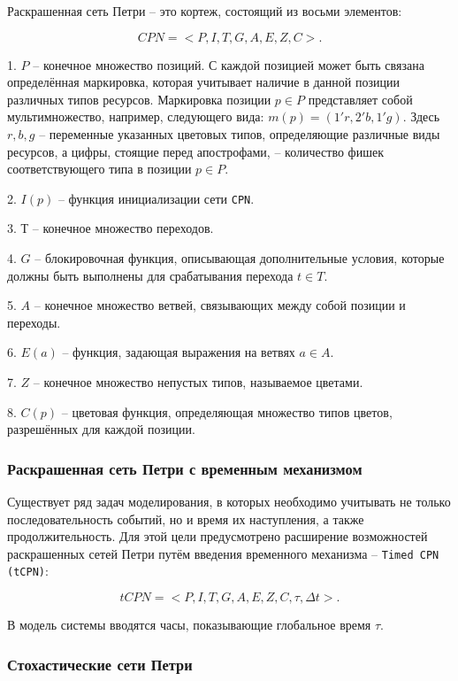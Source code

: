 Раскрашенная сеть Петри -- это кортеж, состоящий из восьми элементов:

\begin{equation}
	CPN = <P, I, T, G, A, E, Z, C>.
\end{equation}

1. $P$ -- конечное множество позиций. С каждой позицией может
быть связана определённая маркировка, которая учитывает наличие
в данной позиции различных типов ресурсов. Маркировка позиции
$p \in P$ представляет собой мультимножество, например, следующего
вида: $m(p) = (1'r,2'b,1'g)$. Здесь $r, b, g$ -- переменные указанных цветовых типов, определяющие различные виды ресурсов, а цифры, стоящие перед апострофами, -- количество фишек соответствующего типа
в позиции $p \in P$.

2. $I(p)$ -- функция инициализации сети \texttt{CPN}.

3. $Т$ -- конечное множество переходов.

4. $G$ -- блокировочная функция, описывающая дополнительные условия, которые должны быть выполнены для срабатывания перехода $t \in T$.

5. $A$ -- конечное множество ветвей, связывающих между собой позиции и переходы.

6. $E(a)$ -- функция, задающая выражения на ветвях $a \in A$.

7. $Z$ -- конечное множество непустых типов, называемое цветами.

8. $C(p)$ -- цветовая функция, определяющая множество типов цветов, разрешённых для каждой позиции.

\subsubsection{Раскрашенная сеть Петри с временным механизмом}

Существует ряд задач моделирования, в которых необходимо учитывать не только последовательность событий, но и время их наступления, а также продолжительность. Для этой цели предусмотрено расширение возможностей раскрашенных сетей Петри путём введения временного механизма -- \texttt{Timed CPN (tCPN)}:

\begin{equation}
	tCPN = <P, I, T, G, A, E, Z, C, \tau, \varDelta t>.
\end{equation}

В модель системы вводятся часы, показывающие глобальное время $\tau$.

\subsubsection{Стохастические сети Петри}

